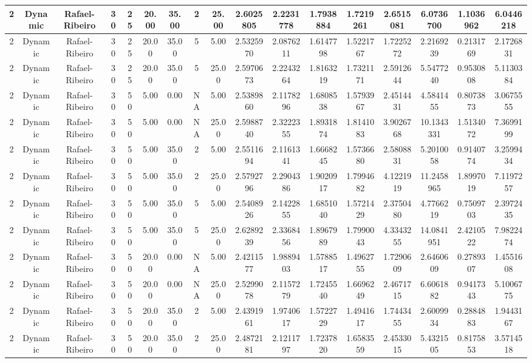 \begin{longtable}{ | c | c | c | c | c | c | c | c | c | c | c | c | c | c | c | c | c | }
	\hline
	2	&	Dynamic	&	Rafael-Ribeiro	&	30	&	25	&	20.00	&	35.00	&	2	&	25.00	&	2.6025805	&	2.2231778	&	1.7938884	&	1.7219261	&	2.6515081	&	6.0736700	&	1.1036962	&	6.0446218 \\
	\hline
	2	&	Dynamic	&	Rafael-Ribeiro	&	30	&	25	&	20.00	&	35.00	&	5	&	5.00	&	2.5325970	&	2.0876211	&	1.6147798	&	1.5221767	&	1.7225272	&	2.2169239	&	0.2131769	&	2.1726831 \\
	\hline
	2	&	Dynamic	&	Rafael-Ribeiro	&	30	&	25	&	20.00	&	35.00	&	5	&	25.00	&	2.5970673	&	2.2243264	&	1.8163219	&	1.7321171	&	2.5912644	&	5.5477240	&	0.9530808	&	5.1130384 \\
	\hline
	2	&	Dynamic	&	Rafael-Ribeiro	&	30	&	50	&	5.00	&	0.00	&	NA	&	5.00	&	2.5389860	&	2.1178296	&	1.6808538	&	1.5793967	&	2.4514431	&	4.5841455	&	0.8073873	&	3.0675555 \\
	\hline
	2	&	Dynamic	&	Rafael-Ribeiro	&	30	&	50	&	5.00	&	0.00	&	NA	&	25.00	&	2.5988740	&	2.3222355	&	1.8931874	&	1.8141083	&	3.9026768	&	10.1343331	&	1.5134072	&	7.3699199 \\
	\hline
	2	&	Dynamic	&	Rafael-Ribeiro	&	30	&	50	&	5.00	&	35.00	&	2	&	5.00	&	2.5511694	&	2.1161341	&	1.6668245	&	1.5736680	&	2.5808831	&	5.2010058	&	0.9140774	&	3.2599434 \\
	\hline
	2	&	Dynamic	&	Rafael-Ribeiro	&	30	&	50	&	5.00	&	35.00	&	2	&	25.00	&	2.5792796	&	2.2904386	&	1.9020917	&	1.7994682	&	4.1221919	&	11.2458965	&	1.8997019	&	7.1197257 \\
	\hline
	2	&	Dynamic	&	Rafael-Ribeiro	&	30	&	50	&	5.00	&	35.00	&	5	&	5.00	&	2.5408926	&	2.1422855	&	1.6851040	&	1.5721429	&	2.3750480	&	4.7766219	&	0.7509703	&	2.3972435 \\
	\hline
	2	&	Dynamic	&	Rafael-Ribeiro	&	30	&	50	&	5.00	&	35.00	&	5	&	25.00	&	2.6289239	&	2.3368456	&	1.8967989	&	1.7990043	&	4.3343255	&	14.0841951	&	2.4210522	&	7.9822474 \\
	\hline
	2	&	Dynamic	&	Rafael-Ribeiro	&	30	&	50	&	20.00	&	0.00	&	NA	&	5.00	&	2.4211577	&	1.9889403	&	1.5788517	&	1.4962755	&	1.7290609	&	2.6460609	&	0.2789307	&	1.4551608 \\
	\hline
	2	&	Dynamic	&	Rafael-Ribeiro	&	30	&	50	&	20.00	&	0.00	&	NA	&	25.00	&	2.5299078	&	2.1157279	&	1.7245540	&	1.6696249	&	2.4671715	&	6.6061882	&	0.9417343	&	5.1006775 \\
	\hline
	2	&	Dynamic	&	Rafael-Ribeiro	&	30	&	50	&	20.00	&	35.00	&	2	&	5.00	&	2.4391961	&	1.9740617	&	1.5722729	&	1.4941617	&	1.7443455	&	2.6009934	&	0.2884883	&	1.9443167 \\
	\hline
	2	&	Dynamic	&	Rafael-Ribeiro	&	30	&	50	&	20.00	&	35.00	&	2	&	25.00	&	2.4872181	&	2.1211797	&	1.7237820	&	1.6583559	&	2.4533015	&	5.4321505	&	0.8175853	&	3.5714518 \\

\end{longtable}
